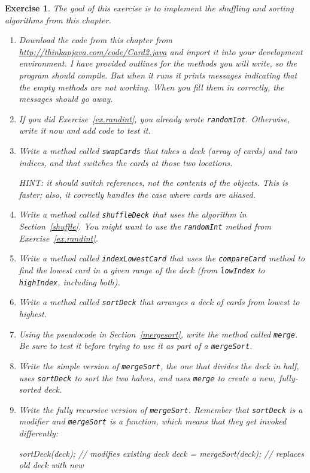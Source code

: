 \documentclass[12pt]{book}
\theoremstyle{exercise}
\newtheorem{exercise}{Exercise}[chapter]
\newcommand{\java}[1]{\lstinline{#1}} %
\begin{document}
\begin{exercise}
The goal of this exercise is to implement the shuffling and sorting algorithms from this chapter.

\begin{enumerate}

\item Download the code from this chapter from \url{http://thinkapjava.com/code/Card2.java} and import it into your development environment.
I have provided outlines for the methods you will write, so the program should compile.
But when it runs it prints messages indicating that the empty methods are not working.
When you fill them in correctly, the messages should go away.

\item If you did Exercise~\ref{ex.randint}, you already wrote \java{randomInt}.
Otherwise, write it now and add code to test it.

\item Write a method called \java{swapCards} that takes a deck (array of cards) and two indices, and that switches the cards at those two locations.

HINT: it should switch references, not the contents of the objects.
This is faster; also, it correctly handles the case where cards are aliased.

\item Write a method called \java{shuffleDeck} that uses the algorithm in Section~\ref{shuffle}.
You might want to use the \java{randomInt} method from Exercise~\ref{ex.randint}.

\item Write a method called \java{indexLowestCard} that uses the \java{compareCard} method to find the lowest card in a given range of the deck (from \java{lowIndex} to \java{highIndex}, including both).

\item Write a method called \java{sortDeck} that arranges a deck of cards from lowest to highest.

\item Using the pseudocode in Section~\ref{mergesort}, write the method called \java{merge}.
Be sure to test it before trying to use it as part of a \java{mergeSort}.

\item Write the simple version of \java{mergeSort}, the one that divides the deck in half, uses \java{sortDeck} to sort the two halves, and uses \java{merge} to create a new, fully-sorted deck.

\item Write the fully recursive version of \java{mergeSort}.
Remember that \java{sortDeck} is a modifier and \java{mergeSort} is a function, which means that they get invoked differently:

\begin{code}
sortDeck(deck);              // modifies existing deck
deck = mergeSort(deck);      // replaces old deck with new
\end{code}

\end{enumerate}
\end{exercise}
\end{document}
